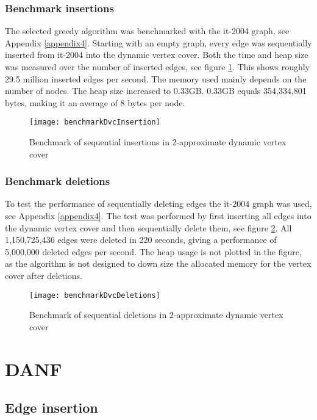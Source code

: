 \subsubsection{Benchmark insertions}
The selected greedy algorithm was benchmarked with the it-2004 graph, see Appendix \ref{appendix4}. Starting with an empty graph, every edge was sequentially inserted from it-2004 into the dynamic vertex cover. Both the time and heap size was measured over the number of inserted edges, see figure \ref{fig:benchmarkDvcInsertion}. This shows roughly 29.5 million inserted edges per second. The memory used mainly depends on the number of nodes. The heap size increased to 0.33GB. 0.33GB equals 354,334,801 bytes, making it an average of 8 bytes per node. 

\begin{figure}[h]
\centering
\texttt{[image: benchmarkDvcInsertion]}    
\captionsetup{justification=centering}
\caption {Benchmark of sequential insertions in 2-approximate dynamic vertex cover}
\label{fig:benchmarkDvcInsertion}
\end{figure}

\subsubsection{Benchmark deletions}
To test the performance of sequentially deleting edges the it-2004 graph was used, see Appendix \ref{appendix4}. The test was performed by first inserting all edges into the dynamic vertex cover and then sequentially delete them, see figure \ref{fig:benchmarkDvcDeletions}. All 1,150,725,436 edges were deleted in 220 seconds, giving a performance of 5,000,000 deleted edges per second. The heap usage is not plotted in the figure, as the algorithm is not designed to down size the allocated memory for the vertex cover after deletions. 

\begin{figure}[h]
\centering
\texttt{[image: benchmarkDvcDeletions]}    
\captionsetup{justification=centering}
\caption {Benchmark of sequential deletions in 2-approximate dynamic vertex cover}
\label{fig:benchmarkDvcDeletions}
\end{figure}


\section{DANF}
\subsection{Edge insertion}

